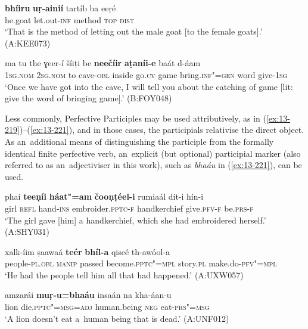 \ex
\label{ex:13-217}
\gll \textbf{bhíiru} \textbf{uṛ-ainií} tartíb ba eeṛé\\
he.goat let.out-\textsc{inf} method \textsc{top} \textsc{dist} \\
\glt `That is the method of letting out the male goat [to the female goats].' (A:KEE073)

\ex
\label{ex:13-218}
\gll ma tu the ɣeer-í šíiṭi be \textbf{neečíir} \textbf{ aṭaníi-e} baát d-áam \\
\textsc{1sg.nom} \textsc{2sg.nom} to cave-\textsc{obl} inside go.\textsc{cv} game  bring.\textsc{inf"=gen} word give-\textsc{1sg} \\
\glt `Once we have got into the cave, I will tell you about the catching of game [lit: give the word of bringing game].' (B:FOY048) 
\z

Less commonly, Perfective Participles may be used attributively, as in (\ref{ex:13-219})--(\ref{ex:13-221}), and in those cases, the participials relativise the direct object. As an~additional means of distinguishing the participle from the formally identical finite perfective verb, an~explicit (but optional) participial marker (also referred to as an~adjectiviser in this work), such as \textit{bhaáu} in (\ref{ex:13-221}), can be used.

\begin{exe}
\ex
\label{ex:13-219}
\gll phaí \textbf{teeṇíi} \textbf{háat"=am} \textbf{čooṇṭéel-i} rumiaál dít-i hín-i\\
girl \textsc{refl} hand-\textsc{ins} embroider.\textsc{pptc-f} handkerchief give.\textsc{pfv-f} be.\textsc{prs-f}\\
\glt `The girl gave [him] a handkerchief, which she had embroidered herself.' (A:SHY031)

\ex
\label{ex:13-220}
\gll xalk-íim ṣaawaá \textbf{teér} \textbf{bhíl-a} qiseé th-awóol-a\\
people-\textsc{pl.obl} \textsc{manip} passed become.\textsc{pptc"=mpl} story.\textsc{pl} make.do-\textsc{pfv"=mpl}\\
\glt `He had the people tell him all that had happened.' (A:UXW057)

\ex
\label{ex:13-221}
\gll amzarái \textbf{muṛ-u=bhaáu} insaán na  kha-áan-u \\
lion die.\textsc{pptc"=msg=adj} human.being \textsc{neg} eat-\textsc{prs"=msg} \\
\glt `A lion doesn't eat a~human being that is dead.' (A:UNF012) 
\end{exe}

